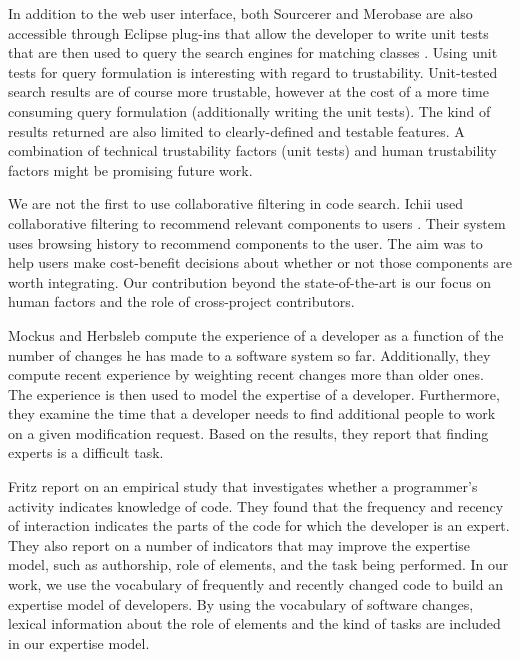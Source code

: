 In addition to the web user interface, both Sourcerer and Merobase are also accessible through Eclipse plug-ins that allow the developer to write unit tests that are then used to query the search engines for matching classes \cite{Lemo07a,Humm08a}. Using unit tests for query formulation is interesting with regard to trustability. Unit-tested search results are of course more trustable, however at the cost of a more time consuming query formulation (\ie additionally writing the unit tests).  The kind of results returned are also limited to clearly-defined and testable features.  A combination of technical trustability factors (\eg unit tests) and human trustability factors might be promising future work.

We are not the first to use collaborative filtering in code search. Ichii \etal used collaborative filtering to recommend relevant components to users \cite{Ichi09a}. Their system uses browsing history to recommend components to the user. The aim was to help users make cost-benefit decisions about whether or not those components are worth integrating. Our contribution beyond the state-of-the-art is our focus on human factors and the role of cross-project contributors.

Mockus and Herbsleb \cite{Mock02b} compute the experience of a developer as a function of the number of changes he has made to a software system so far. Additionally, they compute recent experience by weighting recent changes more than older ones. The experience is then used to model the expertise of a developer. Furthermore, they examine the time that a developer needs to find additional people to work on a given modification request. Based on the results, they report that finding experts is a difficult task.

Fritz \etal \cite{Frit07a} report on an empirical study that investigates whether a programmer's activity indicates knowledge of code. They found that the frequency and recency of interaction  indicates the parts of the code for which the developer is an expert. They also report on a number of indicators that may improve the expertise model, such as authorship, role of elements, and the task being performed. In our work, we use the vocabulary of frequently and recently changed code to build an expertise model of developers. By using the vocabulary of software changes, lexical information about the role of elements and the kind of tasks are included in our expertise model.

